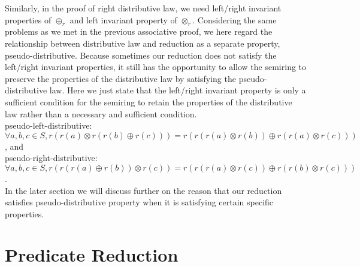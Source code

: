 \documentclass[a4paper,10pt]{article}
\begin{document}
Similarly, in the proof of right distributive law, we need left/right invariant properties of $\oplus_r$ and left invariant property of $\otimes_r$.
Considering the same problems as we met in the previous associative proof, we here regard the relationship between distributive law and reduction as a separate property, pseudo-distributive.
Because sometimes our reduction does not satisfy the left/right invariant properties, it still has the opportunity to allow the semiring to preserve the properties of the distributive law by satisfying the pseudo-distributive law. Here we just state that the left/right invariant property is only a sufficient condition for the semiring to retain the properties of the distributive law rather than a necessary and sufficient condition. \\
pseudo-left-distributive: $\forall a,b,c \in S, r(r(a) \otimes r(r(b)\oplus r(c))) = r(r(r(a) \otimes r(b)) \oplus r(r(a) \otimes r(c)))$, and \\
pseudo-right-distributive: $\forall a,b,c \in S, r(r(r(a) \oplus r(b)) \otimes r(c)) = r(r(r(a) \otimes r(c)) \oplus r(r(b) \otimes r(c)))$. \\
In the later section we will discuss further on the reason that our reduction satisfies pseudo-distributive property when it is satisfying certain specific properties.
\section{Predicate Reduction}
\end{document}
